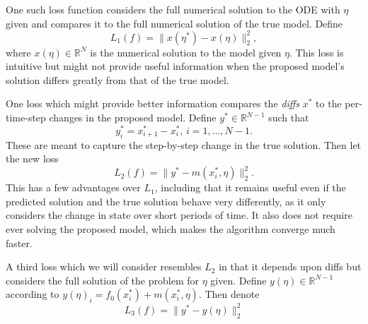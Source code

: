 \documentclass[12pt]{article}
\begin{document}
One such loss function considers the full numerical solution to the ODE with $\eta$ given and compares it to the full numerical solution of the true model. Define $$ L_1(f) = \| x(\eta^*) - x(\eta) \|^2_2, $$ where $x(\eta) \in \mathbb{R}^N$ is the numerical solution to the model given $\eta$. This loss is intuitive but might not provide useful information when the proposed model's solution differs greatly from that of the true model.

One loss which might provide better information compares the \textit{diffs} $x^*$ to the per-time-step changes in the proposed model. Define $y^* \in \mathbb{R}^{N-1}$ such that $$ y^*_i = x^*_{i+1} - x^*_i,\, i = 1, \ldots , N-1. $$  These are meant to capture the step-by-step change in the true solution. Then let the new loss $$ L_2(f) = \| y^* - m(x_i^*, \eta) \|^2_2. $$ This has a few advantages over $L_1$, including that it remains useful even if the predicted solution and the true solution behave very differently, as it only considers the change in state over short periods of time. It also does not require ever solving the proposed model, which makes the algorithm converge much faster.

A third loss which we will consider resembles $L_2$ in that it depends upon diffs but considers the full solution of the problem for $\eta$ given. Define $y(\eta) \in \mathbb{R}^{N-1}$ according to $y(\eta)_i = f_0(x_i^*) + m(x_i^*, \eta)$. Then denote $$ L_3(f) = \| y^* - y(\eta) \|_2^2 $$



\end{document}
